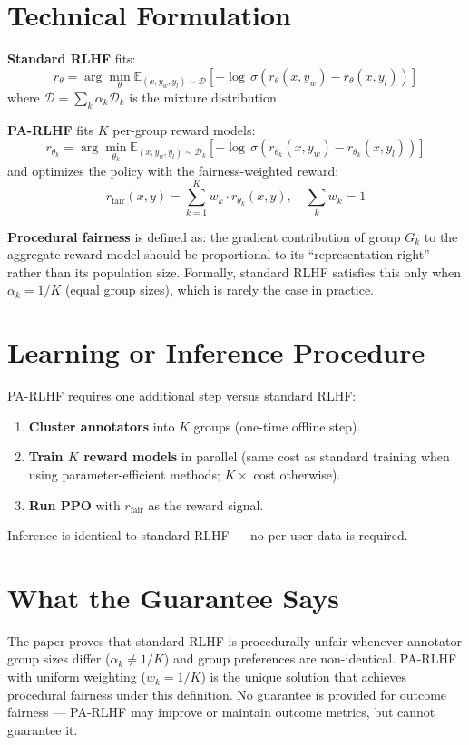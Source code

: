 \documentclass[10pt,twocolumn]{article}
\begin{document}
\section{Technical Formulation}

\textbf{Standard RLHF} fits:
\[
r_\theta = \arg\min_\theta \mathbb{E}_{(x,y_w,y_l) \sim \mathcal{D}}\!\left[-\log\,\sigma(r_\theta(x,y_w) - r_\theta(x,y_l))\right]
\]
where $\mathcal{D} = \sum_k \alpha_k \mathcal{D}_k$ is the mixture distribution.

\textbf{PA-RLHF} fits $K$ per-group reward models:
\[
r_{\theta_k} = \arg\min_{\theta_k} \mathbb{E}_{(x,y_w,y_l) \sim \mathcal{D}_k}\!\left[-\log\,\sigma(r_{\theta_k}(x,y_w) - r_{\theta_k}(x,y_l))\right]
\]
and optimizes the policy with the fairness-weighted reward:
\[
r_{\mathrm{fair}}(x,y) = \sum_{k=1}^K w_k \cdot r_{\theta_k}(x,y), \quad \sum_k w_k = 1
\]

\textbf{Procedural fairness} is defined as: the gradient contribution of group $G_k$
to the aggregate reward model should be proportional to its ``representation right''
rather than its population size. Formally, standard RLHF satisfies this only when
$\alpha_k = 1/K$ (equal group sizes), which is rarely the case in practice.

\section{Learning or Inference Procedure}

PA-RLHF requires one additional step versus standard RLHF:
\begin{enumerate}[itemsep=2pt,parsep=0pt]
  \item \textbf{Cluster annotators} into $K$ groups (one-time offline step).
  \item \textbf{Train $K$ reward models} in parallel (same cost as standard training
    when using parameter-efficient methods; $K \times$ cost otherwise).
  \item \textbf{Run PPO} with $r_{\mathrm{fair}}$ as the reward signal.
\end{enumerate}
Inference is identical to standard RLHF — no per-user data is required.

\section{What the Guarantee Says}

The paper proves that standard RLHF is procedurally unfair whenever annotator
group sizes differ ($\alpha_k \neq 1/K$) and group preferences are non-identical.
PA-RLHF with uniform weighting ($w_k = 1/K$) is the unique solution that achieves
procedural fairness under this definition. No guarantee is provided for outcome
fairness — PA-RLHF may improve or maintain outcome metrics, but cannot guarantee it.
\end{document}
